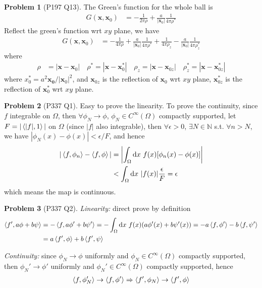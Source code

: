 \documentclass[twoside,11pt]{article}
\newcommand{\N}{\mathbb{N}}
\renewcommand*\d{\mathop{}\!\mathrm{d}}
\theoremstyle{definition}
\newtheorem{problem}{Problem}
\theoremstyle{remark}
\begin{document}
\begin{problem}[P197 Q13]
The Green's function for the whole ball is
\begin{align*}
    G(\mathbf{x}, \mathbf{x}_0) &= -\frac{1}{2\pi\rho}
    + \frac{a}{|\mathbf{x}_0|}\frac{1}{4\pi\rho^*}
\end{align*}
Reflect the green's function wrt $xy$ plane, we have
\begin{align*}
    G(\mathbf{x}, \mathbf{x}_0) &= 
    -\frac{1}{4\pi\rho} + \frac{a}{|\mathbf{x}_0|}\frac{1}{4\pi\rho^*}
    +\frac{1}{4\pi\rho_z} - \frac{a}{|\mathbf{x}_0|}\frac{1}{4\pi\rho^*_z}
\end{align*}
where
\begin{align*}
    \rho &= |\mathbf{x}-\mathbf{x}_0|\quad
    \rho^* = |\mathbf{x}-\mathbf{x}_0^*|\quad
    \rho_z = |\mathbf{x}-\mathbf{x}_{0z}|\quad
    \rho_z^* = |\mathbf{x}-\mathbf{x}_{0z}^*|
\end{align*}
where $x_0^*=a^2\mathbf{x_0}/|\mathbf{x}_0|^2$,
and $\mathbf{x}_{0z}$ is the reflection of $\mathbf{x}_0$ wrt $xy$ plane,
$\mathbf{x}^*_{0z}$ is the reflection of $\mathbf{x}_0^*$ wrt $xy$ plane.

\end{problem}


\begin{problem}[P337 Q1]
Easy to prove the linearity.
To prove the continuity, since $f$ integrable on $\Omega$,
then $\forall\phi_N\rightarrow\phi$, $\phi_N\in C^\infty(\Omega)$
compactly supported, let $F=|\braket{|f|, 1}|$ on $\Omega$
(since $|f|$ also integrable), then
$\forall \epsilon>0$, $\exists N\in\N$ s.t. $\forall n>N$,
we have $|\phi_N(x)-\phi(x)|<\epsilon/F$, and hence
\begin{align*}
    |\braket{f,\phi_n}-\braket{f,\phi}|
    &=\left|
        \int_\Omega\d x\ f(x)[\phi_n(x)-\phi(x)]
    \right|\\
    &<\int_\Omega\d x\ |f(x)|\frac{\epsilon}{F}=\epsilon
\end{align*}
which means the map is continuous.

\end{problem}


\begin{problem}[P337 Q2]
\textit{Linearity:} direct prove by definition
\begin{align*}
    \braket{f',a\phi + b\psi} 
    &=
    -\braket{f,a\phi'+b\psi'}
    =-\int_\Omega\d x\ f(x)(a\phi'(x)+b\psi'(x))
    = -a\braket{f,\phi'} - b\braket{f,\psi'}\\
    &= a\braket{f',\phi} + b\braket{f',\psi}
\end{align*}

\textit{Continuity:} since $\phi_N\rightarrow\phi$ uniformly 
and $\phi_N\in C^\infty(\Omega)$ compactly supported,
then $\phi_N'\rightarrow\phi'$ uniformly and
$\phi_N'\in C^\infty(\Omega)$ compactly supported,
hence
\begin{align*}
    \braket{f,\phi_N'}\rightarrow
    \braket{f,\phi'}
    \Rightarrow
    \braket{f',\phi_N}\rightarrow
    \braket{f',\phi}
\end{align*}

\end{problem}
\end{document}
